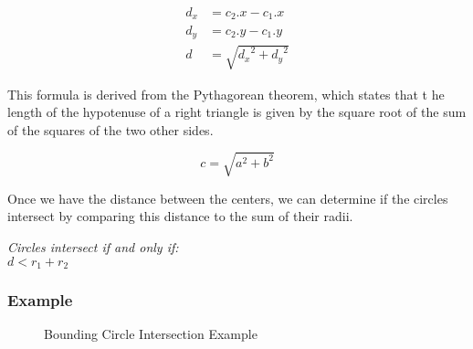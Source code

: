 \begin{equation}
    \begin{aligned}
        d_x & = c_2.x - c_1.x            \\
        d_y & = c_2.y - c_1.y            \\
        d   & = \sqrt{{d_x}^2 + {d_y}^2}
    \end{aligned}
\end{equation}

This formula is derived from the Pythagorean theorem, which states that t he
length of the hypotenuse of a right triangle is given by the square root of the
sum of the squares of the two other sides.

\begin{equation}
    c = \sqrt{a^2 + b^2}
\end{equation}

Once we have the distance between the centers, we can determine if the circles
intersect by comparing this distance to the sum of their radii.

\begin{center}
    \textit{Circles intersect if and only if:}\\
    $d < r_1 + r_2$
\end{center}

\subsubsection{Example}
\begin{figure}[H]
    \begin{center}

        \caption{Bounding Circle Intersection Example}
    \end{center}
\end{figure}

